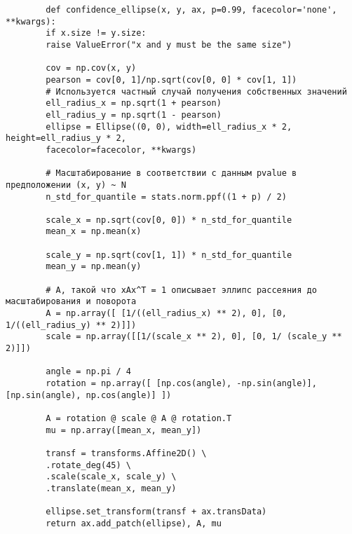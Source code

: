 {
	\vspace{-1.5em}
	\label{conf_ellipse}
	\begin{verbatim}
		def confidence_ellipse(x, y, ax, p=0.99, facecolor='none', **kwargs):
		if x.size != y.size:
		raise ValueError("x and y must be the same size")
		
		cov = np.cov(x, y)
		pearson = cov[0, 1]/np.sqrt(cov[0, 0] * cov[1, 1])
		# Используется частный случай получения собственных значений
		ell_radius_x = np.sqrt(1 + pearson)
		ell_radius_y = np.sqrt(1 - pearson)
		ellipse = Ellipse((0, 0), width=ell_radius_x * 2, height=ell_radius_y * 2,
		facecolor=facecolor, **kwargs)
		
		# Масштабирование в соответствии с данным pvalue в предположении (x, y) ~ N 
		n_std_for_quantile = stats.norm.ppf((1 + p) / 2)
		
		scale_x = np.sqrt(cov[0, 0]) * n_std_for_quantile
		mean_x = np.mean(x)
		
		scale_y = np.sqrt(cov[1, 1]) * n_std_for_quantile
		mean_y = np.mean(y)
		
		# A, такой что xAx^T = 1 описывает эллипс рассеяния до масштабирования и поворота
		A = np.array([ [1/((ell_radius_x) ** 2), 0], [0, 1/((ell_radius_y) ** 2)]])
		scale = np.array([[1/(scale_x ** 2), 0], [0, 1/ (scale_y ** 2)]])
		
		angle = np.pi / 4
		rotation = np.array([ [np.cos(angle), -np.sin(angle)], [np.sin(angle), np.cos(angle)] ])
		
		A = rotation @ scale @ A @ rotation.T
		mu = np.array([mean_x, mean_y])
		
		transf = transforms.Affine2D() \
		.rotate_deg(45) \
		.scale(scale_x, scale_y) \
		.translate(mean_x, mean_y)
		
		ellipse.set_transform(transf + ax.transData)
		return ax.add_patch(ellipse), A, mu
	\end{verbatim}
}

